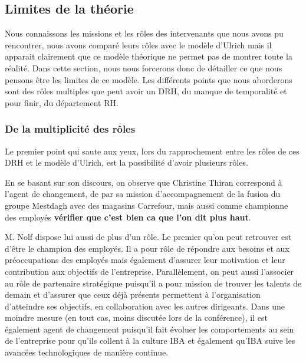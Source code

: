 \subsection{Limites de la théorie}

Nous connaissons les missions et les rôles des intervenants que nous avons pu rencontrer, nous avons comparé leurs rôles avec le modèle d'Ulrich mais il apparait clairement que ce modèle théorique ne permet pas de montrer toute la réalité. Dans cette section, nous nous forcerons donc de détailler ce que nous pensons être les limites de ce modèle. Les différents points que nous aborderons sont des rôles multiples que peut avoir un DRH, du manque de temporalité et pour finir, du département RH. \\

\subsubsection{De la multiplicité des rôles} 

Le premier point qui saute aux yeux, lors du rapprochement entre les rôles de ces DRH et le modèle d'Ulrich, est la possibilité d'avoir plusieurs rôles. \newline

En se basant sur son discours, on observe que Christine Thiran correspond à l'\og{}agent de changement\fg{}, de par sa mission d'accompagnement de la fusion du groupe Mestdagh avec des magasins Carrefour, mais aussi comme \og{}championne des employés\fg{} \textbf{vérifier que c'est bien ca que l'on dit plus haut}. \newline

M. Nolf dispose lui aussi de plus d'un rôle. Le premier qu'on peut retrouver est d'être le \og{}champion des employés\fg{}. Il a pour rôle de répondre aux besoins et aux préoccupations des employés mais également d'assurer leur motivation et leur contribution aux objectifs de l'entreprise. Parallèlement, on peut aussi l'associer au rôle de \og{}partenaire stratégique \fg{} puisqu'il a pour mission de trouver les talents de demain et d'assurer que ceux déjà présents permettent à l'organisation d'atteindre ses objectifs, en collaboration avec les autres dirigeants. Dans une moindre mesure (en tout cas, moins discutée lors de la conférence), il est également \og{}agent de changement\fg{} puisqu'il fait évoluer les comportements au sein de l'entreprise pour qu'ils collent à la culture IBA et également qu'IBA suive les avancées technologiques de manière continue. 

